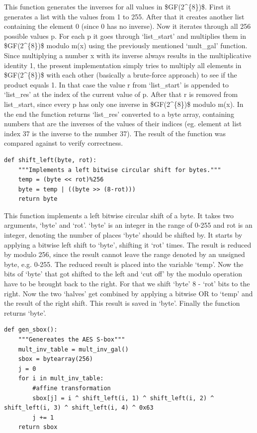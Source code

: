 This function generates the inverses for all values in \ac{$GF(2^{8})$}. First it
generates a list with the values from 1 to 255. After that it creates
another list containing the element 0 (since 0 has no inverse). Now it
iterates through all 256 possible values p. For each p it goes through
`list\_start' and multiplies them in \ac{$GF(2^{8})$} modulo m(x) using the
previously mentioned `mult\_gal' function. Since multiplying a number x
with its inverse always results in the multiplicative identity 1, the
present implementation simply tries to multiply all elements in \ac{$GF(2^{8})$}
with each other (basically a brute-force approach) to see if the product
equals 1. In that case the value r from `list\_start' is appended to
`list\_res' at the index of the current value of p. After that r is
removed from list\_start, since every p has only one inverse in \ac{$GF(2^{8})$}
modulo m(x). In the
end the function returns `list\_res' converted to a byte array,
containing numbers that are the inverses of the values of their indices
(eg. element at list index 37 is the inverse to the number 37).
The result of the function was compared against \cite[Table A.5.]{rijndael} to verify
correctness.

\pagebreak

\begin{lstlisting}
def shift_left(byte, rot):
    """Implements a left bitwise circular shift for bytes."""
    temp = (byte << rot)%256
    byte = temp | ((byte >> (8-rot)))
    return byte
\end{lstlisting}

This function implements a left bitwise circular shift of a byte. It
takes two arguments, `byte' and `rot'. `byte' is an integer in the range
of 0-255 and rot is an integer, denoting the number of places `byte'
should be shifted by. It starts by applying a bitwise left shift to
`byte', shifting it `rot' times. The result is reduced by modulo 256,
since the result cannot leave the range denoted by an unsigned byte,
e.g. 0-255. The reduced result is placed into the variable `temp'. Now
the bits of `byte' that got shifted to the left and `cut off' by the
modulo operation have to be brought back to the right. For that we shift
`byte' 8 - `rot' bits to the right. Now the two `halves' get combined by
applying a bitwise OR to `temp' and the result of the right shift. This
result is saved in `byte'. Finally the function returns `byte'.

\begin{lstlisting}
def gen_sbox():
    """Genereates the AES S-box"""
    mult_inv_table = mult_inv_gal()
    sbox = bytearray(256)
    j = 0
    for i in mult_inv_table:
        #affine transformation
        sbox[j] = i ^ shift_left(i, 1) ^ shift_left(i, 2) ^ shift_left(i, 3) ^ shift_left(i, 4) ^ 0x63
        j += 1
    return sbox
\end{lstlisting}

